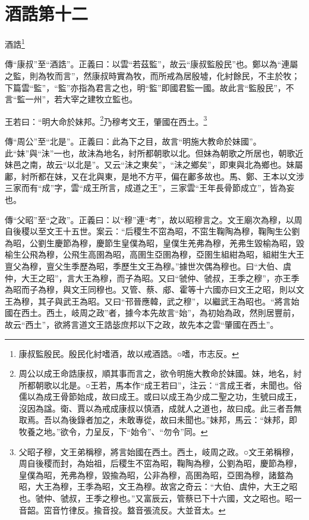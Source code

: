\section{酒誥第十二}


酒誥\footnote{康叔監殷民。殷民化紂嗜酒，故以戒酒誥。○嗜，巿志反。}

{\noindent\shu{}\fzkt 傳“康叔”至“酒誥”。正義曰：以雲“若茲監”，故云“康叔監殷民”也。鄭以為“連屬之監，則為牧而言”，然康叔時實為牧，而所戒為居殷墟，化紂餘民，不主於牧；下篇雲“監”，“監”亦指為君言之也，明“監”即國君監一國。故此言“監殷民”，不言“監一州”，若大宰之建牧立監也。 \par}

王若曰：“明大命於妹邦。\footnote{周公以成王命誥康叔，順其事而言之，欲令明施大教命於妹國。妹，地名，紂所都朝歌以北是。○王若，馬本作“成王若曰”，注云：“言成王者，未聞也。俗儒以為成王骨節始成，故曰成王。或曰以成王為少成二聖之功，生號曰成王，沒因為諡。衛、賈以為戒成康叔以慎酒，成就人之道也，故曰成。此三者吾無取焉。吾以為後錄者加之，未敢專從，故曰未聞也。”妹邦，馬云：“妹邦，即牧養之地。”欲令，力呈反，下“始令”、“勿令”同。}乃穆考文王，肇國在西土。\footnote{父昭子穆，文王弟稱穆，將言始國在西土。西土，岐周之政。○文王弟稱穆，周自後稷而封，為始祖，后稷生不窋為昭，鞠陶為穆，公劉為昭，慶節為穆，皇僕為昭，羌弗為穆，毀揄為昭，公非為穆，高圉為昭，亞圉為穆，諸盩為昭，大王為穆，王季為昭，文王為穆。故宮之奇云：“大伯、虞仲，大王之昭也。虢仲、虢叔，王季之穆也。”又富辰云，管蔡已下十六國，文之昭也。昭一音韶。窋音竹律反。揄音投。盩音張流反。大並音太。}


{\noindent\zhuan{}\fzbyks 傳“周公”至“北是”。正義曰：此為下之目，故言“明施大教命於妹國”。此“妹”與“沬”一也，故沬為地名，紂所都朝歌以北。但妹為朝歌之所居也，朝歌近妹邑之南，故云“以北是”。又云“沬之東矣”，“沬之鄉矣”，即東與北為鄉也。妹屬鄘，紂所都在妹，又在北與東，是地不方平，偏在鄘多故也。馬、鄭、王本以文涉三家而有“成”字，雲“成王所言，成道之王”，三家雲“王年長骨節成立”，皆為妄也。 \par}

{\noindent\zhuan{}\fzbyks 傳“父昭”至“之政”。正義曰：以“穆”連“考”，故以昭穆言之。文王廟次為穆，以周自後稷以至文王十五世。案云：“后稷生不窋為昭，不窋生鞠陶為穆，鞠陶生公劉為昭，公劉生慶節為穆，慶節生皇僕為昭，皇僕生羌弗為穆，羌弗生毀榆為昭，毀榆生公飛為穆，公飛生高圉為昭，高圉生亞圉為穆，亞圉生組紺為昭，組紺生大王亶父為穆，亶父生季歷為昭，季歷生文王為穆。”據世次偶為穆也。曰“大伯、虞仲，大王之昭”，言大王為穆，而子為昭。又曰“虢仲、虢叔，王季之穆”，亦王季為昭而子為穆，與文王同穆也。又管、蔡、郕、霍等十六國亦曰文王之昭，則以文王為穆，其子與武王為昭。又曰“邗晉應韓，武之穆”，以繼武王為昭也。“將言始國在西土。西土，岐周之政”者，據今本先故言“始”，為初始為政，然則居豐前，故云“西土”，欲將言道文王誥毖庶邦以下之政，故先本之雲“肇國在西土”。 \par}

